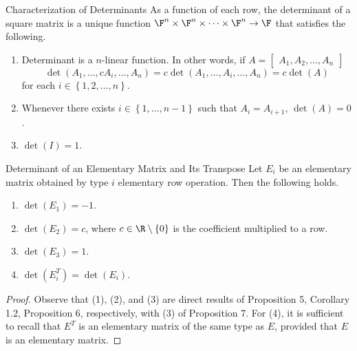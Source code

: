 \documentclass[linearalgebra]{subfiles}
\begin{document}
    \begin{theorem}{Characterization of Determinants}
        As a function of each row, the determinant of a square matrix is a unique function $\F^n\times \F^n\times\cdots\times\F^n\to \F$ that satisfies the following.
        \begin{enumerate}
            \item Determinant is a $n$-linear function. In other words, if $A = \begin{bmatrix} A_1, A_2, \ldots, A_n\end{bmatrix}$ 
                \begin{equation*}
                    \det (A_1, \ldots, cA_i, \ldots, A_n) = c\det(A_1, \ldots, A_i, \ldots, A_n) = c\det(A)
                \end{equation*}
                for each $i\in \left\lbrace 1, 2, \ldots, n \right\rbrace$.
            \item Whenever there exists $i\in \left\lbrace 1, \ldots, n-1 \right\rbrace$ such that $A_i = A_{i+1}$, $\det(A) = 0$.
            \item $\det(I) = 1$.
        \end{enumerate}
    \end{theorem}

    \clearpage
    \begin{cor}{Determinant of an Elementary Matrix and Its Transpose}
        Let $E_i$ be an elementary matrix obtained by type $i$ elementary row operation. Then the following holds.
        \begin{enumerate}
            \item $\det(E_1) = -1$.
            \item $\det(E_2) = c$, where $c\in \R\setminus \left\lbrace 0 \right\rbrace$ is the coefficient multiplied to a row.
            \item $\det(E_3) = 1$.
            \item $\det\left(E_i^T\right) = \det \left(E_i\right)$.
        \end{enumerate}
    \end{cor}	

    \begin{proof}
        Observe that (1), (2), and (3) are direct results of Proposition 5, Corollary 1.2, Proposition 6, respectively, with (3) of Proposition 7. For (4), it is sufficient to recall that $E^T$ is an elementary matrix of the same type as $E$, provided that $E$ is an elementary matrix.
    \end{proof}
\end{document}
